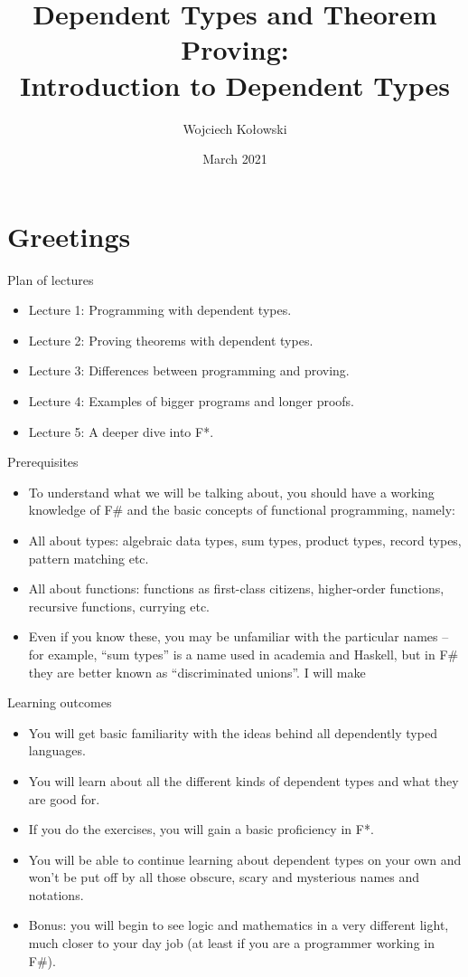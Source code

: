 \documentclass{beamer}
\title{Dependent Types and Theorem Proving: \\Introduction to Dependent Types}
\author{Wojciech Kołowski}
\date{March 2021}
\begin{document}
\frame{\titlepage}

\section{Greetings}

\begin{frame}{Plan of lectures}
\begin{itemize}
	\item Lecture 1: Programming with dependent types.
	\item Lecture 2: Proving theorems with dependent types.
	\item Lecture 3: Differences between programming and proving.
	\item Lecture 4: Examples of bigger programs and longer proofs.
	\item Lecture 5: A deeper dive into F*.
\end{itemize}
\end{frame}

\begin{frame}{Prerequisites}
\begin{itemize}
	\item To understand what we will be talking about, you should have a working knowledge of F\# and the basic concepts of functional programming, namely:
	\item All about types: algebraic data types, sum types, product types, record types, pattern matching etc.
	\item All about functions: functions as first-class citizens, higher-order functions, recursive functions, currying etc.
	\item Even if you know these, you may be unfamiliar with the particular names -- for example, ``sum types'' is a name used in academia and Haskell, but in F\# they are better known as ``discriminated unions''. I will make 
\end{itemize}
\end{frame}

\begin{frame}{Learning outcomes}
\begin{itemize}
	\item You will get basic familiarity with the ideas behind all dependently typed languages.
	\item You will learn about all the different kinds of dependent types and what they are good for.
	\item If you do the exercises, you will gain a basic proficiency in F*.
	\item You will be able to continue learning about dependent types on your own and won't be put off by all those obscure, scary and mysterious names and notations.
	\item Bonus: you will begin to see logic and mathematics in a very different light, much closer to your day job (at least if you are a programmer working in F\#).
\end{itemize}
\end{frame}
\end{document}
